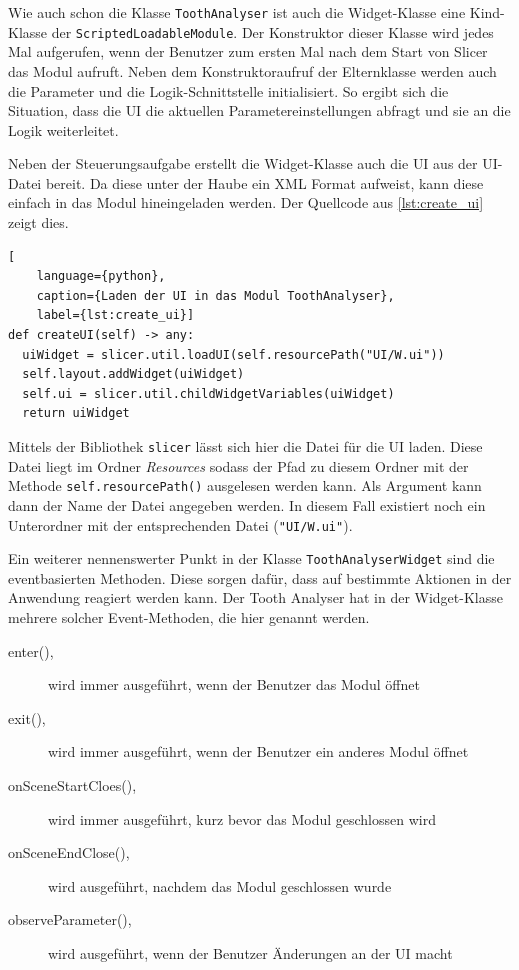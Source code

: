 Wie auch schon die Klasse \texttt{ToothAnalyser} ist auch die Widget-Klasse eine
Kind-Klasse der \texttt{ScriptedLoadableModule}. Der Konstruktor dieser Klasse
wird jedes Mal aufgerufen, wenn der Benutzer zum ersten Mal nach dem Start von Slicer
das Modul aufruft. Neben dem Konstruktoraufruf der Elternklasse werden auch die
Parameter und die Logik-Schnittstelle initialisiert. So ergibt sich die Situation,
dass die \ac{UI} die aktuellen Parametereinstellungen abfragt und sie an die Logik
weiterleitet.

Neben der Steuerungsaufgabe erstellt die Widget-Klasse auch die \ac{UI} aus der
\ac{UI}-Datei bereit. Da diese unter der Haube ein \ac{XML} Format aufweist,
kann diese einfach in das Modul hineingeladen werden. Der Quellcode aus \ref{lst:create_ui}
zeigt dies.

\begin{lstlisting}[
    language={python},
    caption={Laden der UI in das Modul ToothAnalyser},
    label={lst:create_ui}]
def createUI(self) -> any:
  uiWidget = slicer.util.loadUI(self.resourcePath("UI/W.ui"))
  self.layout.addWidget(uiWidget)
  self.ui = slicer.util.childWidgetVariables(uiWidget)
  return uiWidget
\end{lstlisting}

Mittels der Bibliothek \texttt{slicer} lässt sich hier die Datei für die \ac{UI}
laden. Diese Datei liegt im Ordner \textit{Resources} sodass der Pfad zu diesem
Ordner mit der Methode \texttt{self.resourcePath()} ausgelesen werden kann. Als
Argument kann dann der Name der Datei angegeben werden. In diesem Fall existiert
noch ein Unterordner mit der entsprechenden Datei (\texttt{"UI/W.ui"}).

Ein weiterer nennenswerter Punkt in der Klasse \texttt{ToothAnalyserWidget} sind
die eventbasierten Methoden. Diese sorgen dafür, dass auf bestimmte Aktionen in der
Anwendung reagiert werden kann. Der Tooth Analyser hat in der Widget-Klasse
mehrere solcher Event-Methoden, die hier genannt werden.

\begin{description}
	\item[enter(),] wird immer ausgeführt, wenn der Benutzer das Modul öffnet

	\item[exit(),] wird immer ausgeführt, wenn der Benutzer ein anderes Modul
		öffnet

	\item[onSceneStartCloes(),] wird immer ausgeführt, kurz bevor das Modul
		geschlossen wird

	\item[onSceneEndClose(),] wird ausgeführt, nachdem das Modul geschlossen wurde

	\item[observeParameter(),] wird ausgeführt, wenn der Benutzer Änderungen an
		der \ac{UI} macht
\end{description}

